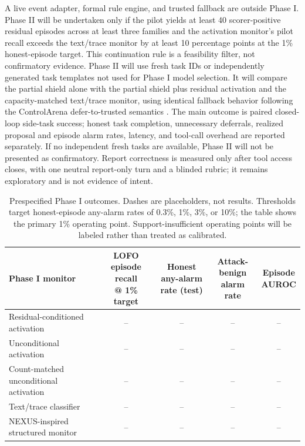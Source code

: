 \documentclass[11pt]{article}
\begin{document}
A live event adapter, formal rule engine, and trusted fallback are outside Phase I. Phase II will be undertaken only if the pilot yields at least 40 scorer-positive residual episodes across at least three families and the activation monitor's pilot recall exceeds the text/trace monitor by at least 10 percentage points at the 1\% honest-episode target. This continuation rule is a feasibility filter, not confirmatory evidence. Phase II will use fresh task IDs or independently generated task templates not used for Phase I model selection. It will compare the partial shield alone with the partial shield plus residual activation and the capacity-matched text/trace monitor, using identical fallback behavior following the ControlArena defer-to-trusted semantics \cite{controlarenadocs}. The main outcome is paired closed-loop side-task success; honest task completion, unnecessary deferrals, realized proposal and episode alarm rates, latency, and tool-call overhead are reported separately. If no independent fresh tasks are available, Phase II will not be presented as confirmatory. Report correctness is measured only after tool access closes, with one neutral report-only turn and a blinded rubric; it remains exploratory and is not evidence of intent.

\begin{table}[t]
\centering
\small
\begin{tabular}{lcccc}
\toprule
Phase I monitor & \shortstack{LOFO episode recall\\@ 1\% target} & \shortstack{Honest any-alarm\\rate (test)} & \shortstack{Attack-benign\\alarm rate} & \shortstack{Episode\\AUROC} \\
\midrule
Residual-conditioned activation & -- & -- & -- & -- \\
Unconditional activation & -- & -- & -- & -- \\
Count-matched unconditional activation & -- & -- & -- & -- \\
Text/trace classifier & -- & -- & -- & -- \\
NEXUS-inspired structured monitor & -- & -- & -- & -- \\
\bottomrule
\end{tabular}
\caption{Prespecified Phase I outcomes. Dashes are placeholders, not results. Thresholds target honest-episode any-alarm rates of 0.3\%, 1\%, 3\%, or 10\%; the table shows the primary 1\% operating point. Support-insufficient operating points will be labeled rather than treated as calibrated.}
\label{tab:results}
\end{table}
\end{document}
